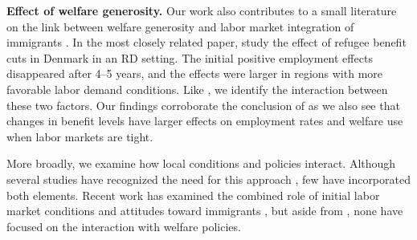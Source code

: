 



\textbf{Effect of welfare generosity.} Our work also contributes to a small literature on the link between welfare generosity and labor market integration of immigrants \citep{Bratsberg2020ImmigrantGenerosity}. In the most closely related paper, \citet{dustmann2024} study the effect of refugee benefit cuts in Denmark in an RD setting. The initial positive employment effects disappeared after 4--5 years, and the effects were larger in regions with more favorable labor demand conditions. Like \citet{dustmann2024}, we identify the interaction between these two factors. Our findings corroborate the conclusion of \citet{dustmann2024} as we also see that changes in benefit levels have larger effects on employment rates and welfare use when labor markets are tight.

More broadly, we examine how local conditions and policies interact. Although several studies have recognized the need for this approach \citep[e.g.,][]{fasani_struggle_2022, muller_labor_2023}, few have incorporated both elements. Recent work has examined the combined role of initial labor market conditions and attitudes toward immigrants \citep{muller_labor_2023, aksoy_first_2023, schilling_impact_2021}, but aside from \citet{dustmann2024}, none have focused on the interaction with welfare policies.






